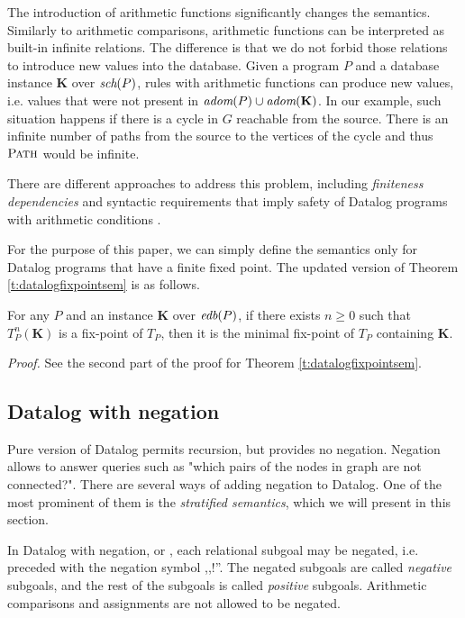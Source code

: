 The introduction of arithmetic functions significantly changes the semantics.
Similarly to arithmetic comparisons, arithmetic functions can be interpreted as built-in infinite relations. 
The difference is that we do not forbid those relations to introduce new values into the database.
Given a program $P$ and a database instance $\textbf{K}$ over $\textit{sch}(P)$, rules with arithmetic functions can produce new values, i.e. values that were not present in $\textit{adom}(P) \cup \textit{adom}(\textbf{K})$. In our example, such situation happens if there is a cycle in $G$ reachable from the source. There is an infinite number of paths from the source to the vertices of the cycle and thus $\textsc{Path}$ would be infinite.

There are different approaches to address this problem, including \emph{finiteness dependencies} and syntactic requirements that imply safety of Datalog programs with arithmetic conditions \cite{RBS87, KRS88a, KRS88b, SV89}.

For the purpose of this paper, we can simply define the semantics only for Datalog programs that have a finite fixed point. The updated version of Theorem \ref{t:datalogfixpointsem} is as follows.

\begin{thm}
For any $P$ and an instance $\textbf{K}$ over $\textit{edb}(P)$, if there exists $n \ge 0$ such that $T_P^n(\textbf{K})$ is a fix-point of $T_P$, then it is the minimal fix-point of $T_P$ containing $\textbf{K}$.
\end{thm}
\emph{Proof.} See the second part of the proof for Theorem \ref{t:datalogfixpointsem}.

\subsection{Datalog with negation}\label{ss:datalogneg}
Pure version of Datalog permits recursion, but provides no negation. Negation allows to answer queries such as "which pairs of the nodes in graph are not connected?". There are several ways of adding negation to Datalog. One of the most prominent of them is the \emph{stratified semantics}, which we will present in this section. 

In Datalog with negation, or \datalogneg, each relational subgoal may be negated, i.e. preceded with the negation symbol ,,$!$''. The negated subgoals are called \emph{negative} subgoals, and the rest of the subgoals is called \emph{positive} subgoals. Arithmetic comparisons and assignments are not allowed to be negated.

